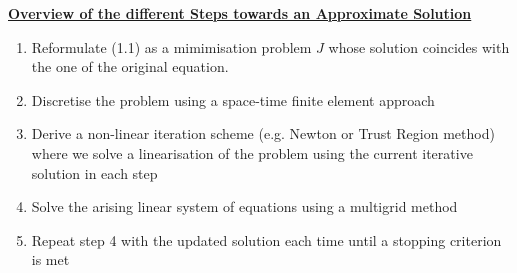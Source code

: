 \documentclass[../draft_1.tex]{subfiles}
\begin{document}
\begin{framed}
	\underline{\textbf{Overview of the different Steps towards an Approximate Solution}} 
	
	\begin{enumerate}
		\item  Reformulate (1.1) as a mimimisation problem $J$ whose solution coincides with the one of the original equation. 
		\item Discretise the problem using a space-time finite element approach
		\item Derive a non-linear iteration scheme (e.g. Newton or Trust Region method) where we solve a linearisation of the problem using the current iterative solution in each step
		\item  Solve the arising linear system of equations using a multigrid method
		\item Repeat step 4 with the updated solution each time until a stopping criterion is met 
	\end{enumerate}	
\end{framed}
\end{document}
